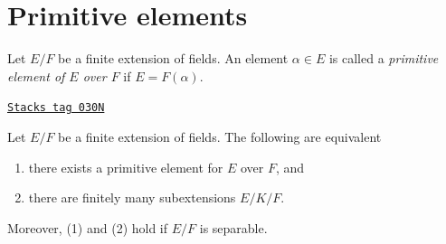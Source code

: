 \section{Primitive elements}
\label{fields-section-primitive-element}
Let $E/F$ be a finite extension of fields. An element $\alpha \in E$
is called a {\it primitive element of $E$ over $F$} if $E = F(\alpha)$.

\begin{lemma}

\label{fields-lemma-primitive-element}
\href{https://stacks.math.columbia.edu/tag/030N}{\texttt{Stacks tag 030N}}

Let $E/F$ be a finite extension of fields. The following are equivalent
\begin{enumerate}
\item there exists a primitive element for $E$ over $F$, and
\item there are finitely many subextensions $E/K/F$.
\end{enumerate}
Moreover, (1) and (2) hold if $E/F$ is separable.
\end{lemma}

